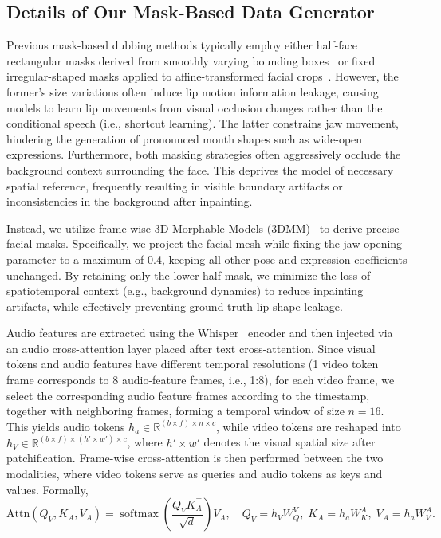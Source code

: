 \subsection{Details of Our Mask-Based Data Generator}
\label{appendix_sec:generator}

Previous mask-based dubbing methods typically employ either half-face rectangular masks derived from smoothly varying bounding boxes~\cite{prajwal2020wav2lip,cheng2022videoretalking,wang2023talklip,zhang2023dinet} or fixed irregular-shaped masks applied to affine-transformed facial crops~\cite{guan2023stylesync,li2024latentsync}. 
However, the former's size variations often induce lip motion information leakage, causing models to learn lip movements from visual occlusion changes rather than the conditional speech (i.e., shortcut learning). 
The latter constrains jaw movement, hindering the generation of pronounced mouth shapes such as wide-open expressions. 
Furthermore, both masking strategies often aggressively occlude the background context surrounding the face. This deprives the model of necessary spatial reference, frequently resulting in visible boundary artifacts or inconsistencies in the background after inpainting.

Instead, we utilize frame-wise 3D Morphable Models (3DMM)~\citep{SMIRK:CVPR:2024} to derive precise facial masks. Specifically, we project the facial mesh while fixing the jaw opening parameter to a maximum of 0.4, keeping all other pose and expression coefficients unchanged. By retaining only the lower-half mask, we minimize the loss of spatiotemporal context (e.g., background dynamics) to reduce inpainting artifacts, while effectively preventing ground-truth lip shape leakage.

Audio features are extracted using the Whisper~\citep{radford2023whisper} encoder and then injected via an audio cross-attention layer placed after text cross-attention.
Since visual tokens and audio features have different temporal resolutions (1 video token frame corresponds to 8 audio-feature frames, i.e., 1:8), for each video frame, we select the corresponding audio feature frames according to the timestamp, together with neighboring frames, forming a temporal window of size $n = 16$.  
This yields audio tokens $h_a \in \mathbb{R}^{(b \times f) \times n \times c}$, while video tokens are reshaped into $h_V \in \mathbb{R}^{(b \times f) \times (h'\times w') \times c}$, where $h'\times w'$ denotes the visual spatial size after patchification.  
Frame-wise cross-attention is then performed between the two modalities, where video tokens serve as queries and audio tokens as keys and values. 
Formally,
\begin{equation}
\mathrm{Attn}(Q_V,K_A,V_A)
= \operatorname{softmax}\!\left(\frac{Q_V K_A^\top}{\sqrt{d}}\right) V_A,
\quad
Q_V = h_V W_Q^V,\; K_A = h_a W_K^A,\; V_A = h_a W_V^A.
\label{eq:frame_xattn_simple}
\end{equation}

